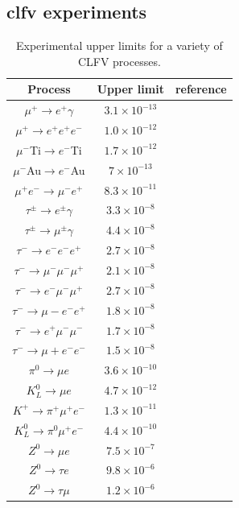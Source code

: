 \begin{refsection}
    \subsection{\gls{clfv} experiments}
        \begin{table}[!h]
            \centering
            \begin{tabular}{c|c|c}
            \hline
            Process & Upper limit & reference\\
            \hline
            \hline
            $\mu^+\rightarrow e^+\gamma$ & $3.1\times 10^{-13}$ & \cite{MEG_II:physics}\\
            $\mu^+\rightarrow e^+e^+e^-$ & $1.0\times 10^{-12}$ & \cite{SINDRUM}\\
            $\mu^-$Ti$\rightarrow e^-$Ti  & $1.7\times 10^{-12}$ & \cite{SINDRUM}\\
            $\mu^-$Au$\rightarrow e^-$Au  & $7\times 10^{-13}$   & \cite{Bertl}\\
            $\mu^+e^-\rightarrow \mu^-e^+$ & $8.3\times 10^{-11}$ & \cite{Willmann}\\
            $\tau^\pm\rightarrow e^\pm\gamma$ & $3.3\times 10^{-8}$ & \cite{Aubert}\\
            $\tau^\pm\rightarrow \mu^\pm\gamma$ & $4.4\times 10^{-8}$ & \cite{Aubert}\\
            $\tau^-\rightarrow e^-e^-e^+$ & $2.7\times 10^{-8}$ & \cite{Hayasaka}\\
            $\tau^-\rightarrow \mu^-\mu^-\mu^+$ & $2.1\times 10^{-8}$ & \cite{Hayasaka}\\
            $\tau^-\rightarrow e^-\mu^-\mu^+$ & $2.7\times 10^{-8}$ & \cite{Hayasaka}\\
            $\tau^-\rightarrow \mu-e^-e^+$ & $1.8\times 10^{-8}$ & \cite{Hayasaka}\\
            $\tau^-\rightarrow e^+\mu^-\mu^-$ & $1.7\times 10^{-8}$ & \cite{Hayasaka}\\
            $\tau^-\rightarrow \mu+e^-e^-$ & $1.5\times 10^{-8}$ & \cite{Hayasaka}\\
            $\pi^0\rightarrow \mu e$ & $3.6\times 10^{-10}$ & \cite{Abouzaid}\\
            $K^0_L\rightarrow \mu e$ & $4.7\times 10^{-12}$ & \cite{Ambrose}\\
            $K^+\rightarrow \pi^+\mu^+e^-$ & $1.3\times 10^{-11}$ & \cite{Sher}\\
            $K^0_L\rightarrow \pi^0\mu^+e^-$ & $4.4\times 10^{-10}$ & \cite{Abouzaid}\\
            $Z^0\rightarrow \mu e$ & $7.5\times10^{-7}$& \cite{Aad}\\
            $Z^0\rightarrow \tau e$ & $9.8\times10^{-6}$& \cite{Akers} \\
            $Z^0\rightarrow \tau \mu$ & $1.2\times10^{-6}$& \cite{Akers}\\
            \hline
            \end{tabular}
            \caption[Limits for CLFV processes]{Experimental upper limits for a variety of CLFV processes.}
        \label{T_CLFV}
        \end{table}
        

\end{refsection}
